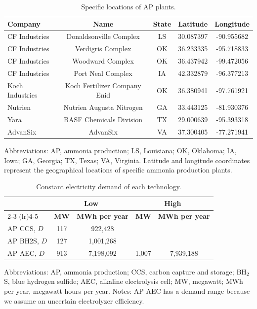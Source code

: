 \documentclass{article}
\begin{document}
\begin{table}[H]
  \centering
  \caption{Specific locations of AP plants.}
  \label{table:ap_plant_locations}
  \begin{tabular}{@{}lcccc@{}}
    \toprule
    \textbf{Company} & \textbf{Name} & \textbf{State} & \textbf{Latitude} & \textbf{Longitude} \\ \midrule
    CF Industries & Donaldsonville Complex & LS & 30.087397 & -90.955682 \\
    CF Industries & Verdigris Complex & OK & 36.233335 & -95.718833 \\
    CF Industries & Woodward Complex & OK & 36.437942 & -99.472056 \\
    CF Industries & Port Neal Complex & IA & 42.332879 & -96.377213 \\
    Koch Industries & Koch Fertilizer Company Enid & OK & 36.380941 & -97.761921 \\
    Nutrien & Nutrien Augusta Nitrogen & GA & 33.443125 & -81.930376 \\
    Yara & BASF Chemicals Division & TX & 29.000639 & -95.393318 \\
    AdvanSix & AdvanSix & VA & 37.300405 & -77.271941 \\ \bottomrule
  \end{tabular}
  \begin{tablenotes}
  \small
  \item Abbreviations: AP, ammonia production; LS, Louisiana; OK, Oklahoma; IA, Iowa; GA, Georgia; TX, Texas; VA, Virginia. Latitude and longitude coordinates represent the geographical locations of specific ammonia production plants.
\end{tablenotes}

\end{table}

\begin{table}[H]
  \centering
  \caption{Constant electricity demand of each technology.}
  \label{table:constant_electricity_demand}
  \begin{tabular}{@{}lcccc@{}}
    \toprule
    & \multicolumn{2}{c}{\textbf{Low}} & \multicolumn{2}{c}{\textbf{High}} \\ \cmidrule(lr){2-3} \cmidrule(lr){4-5}
    & \textbf{MW} & \textbf{MWh per year} & \textbf{MW} & \textbf{MWh per year} \\ \midrule
    AP CCS, $D$ & 117 & 922,428 &  &  \\
    AP BH2S, $D$ & 127 & 1,001,268 &  &  \\
    AP AEC, $D$ & 913 & 7,198,092 & 1,007 & 7,939,188 \\ \bottomrule
  \end{tabular}
\begin{tablenotes}
  \small
  \item Abbreviations: AP, ammonia production; CCS, carbon capture and storage; BH$_2$S, blue hydrogen sulfide; AEC, alkaline electrolysis cell; MW, megawatt; MWh per year, megawatt-hours per year. Notes: AP AEC has a demand range because we assume an uncertain electrolyzer efficiency.
\end{tablenotes}

\end{table}
\end{document}
